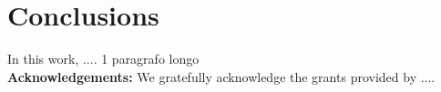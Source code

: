 \section{Conclusions}
	\label{co}
	\par In this work, .... 1 paragrafo longo
	\\
	\textbf{Acknowledgements:} We gratefully acknowledge the grants provided by ....